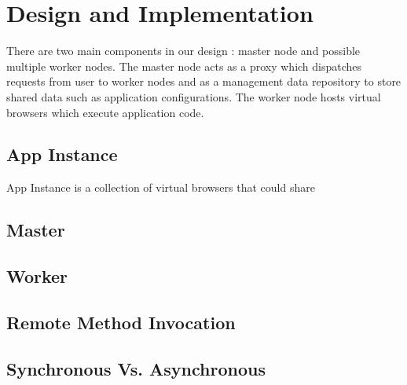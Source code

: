 \section{Design and Implementation}
\label{sec:implementation}
There are two main components in our design : master node and possible multiple worker nodes.
The master node acts as a proxy which dispatches requests from user to worker nodes 
and as a management data repository to store shared data such as application configurations.
The worker node hosts virtual browsers which execute application code.

\subsection{App Instance}
App Instance is a collection of virtual browsers that could share


\subsection{Master}

\subsection{Worker}

\subsection{Remote Method Invocation}

\subsection{Synchronous Vs. Asynchronous}